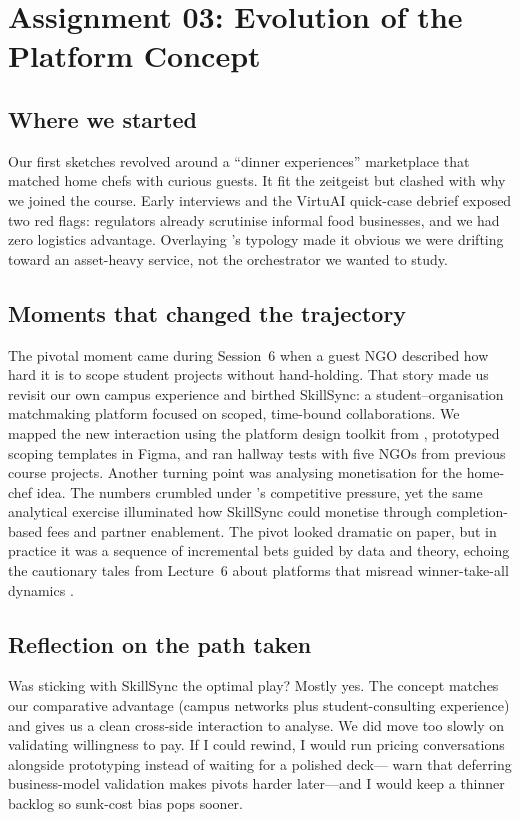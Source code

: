 \section*{Assignment 03: Evolution of the Platform Concept}

\subsection*{Where we started}
Our first sketches revolved around a ``dinner experiences'' marketplace that matched home chefs with curious guests. It fit the zeitgeist but clashed with why we joined the course. Early interviews and the VirtuAI quick-case debrief \citep{Gunasilan2024} exposed two red flags: regulators already scrutinise informal food businesses, and we had zero logistics advantage. Overlaying \citet{Choudary2016}'s typology made it obvious we were drifting toward an asset-heavy service, not the orchestrator we wanted to study.

\subsection*{Moments that changed the trajectory}
The pivotal moment came during Session~6 when a guest NGO described how hard it is to scope student projects without hand-holding. That story made us revisit our own campus experience and birthed SkillSync: a student--organisation matchmaking platform focused on scoped, time-bound collaborations. We mapped the new interaction using the platform design toolkit from \citet{Reillier2017}, prototyped scoping templates in Figma, and ran hallway tests with five NGOs from previous course projects. Another turning point was analysing monetisation for the home-chef idea. The numbers crumbled under \citet{Porter2008}'s competitive pressure, yet the same analytical exercise illuminated how SkillSync could monetise through completion-based fees and partner enablement. The pivot looked dramatic on paper, but in practice it was a sequence of incremental bets guided by data and theory, echoing the cautionary tales from Lecture~6 about platforms that misread winner-take-all dynamics \citep{Lecture06}.

\subsection*{Reflection on the path taken}
Was sticking with SkillSync the optimal play? Mostly yes. The concept matches our comparative advantage (campus networks plus student-consulting experience) and gives us a clean cross-side interaction to analyse. We did move too slowly on validating willingness to pay. If I could rewind, I would run pricing conversations alongside prototyping instead of waiting for a polished deck---\citet{HagiuWright2013} warn that deferring business-model validation makes pivots harder later---and I would keep a thinner backlog so sunk-cost bias pops sooner.

